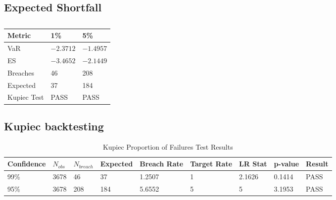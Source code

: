 \subsection{Expected Shortfall}


\begin{table}[H]
\centering
\caption{}
\begin{tabular}{|l|l|l|}
\hline
\textbf{Metric} & \textbf{1\%} & \textbf{5\%} \\
\hline
VaR              & $-2.3712$ & $-1.4957$ \\
\hline
ES               & $-3.4652$ & $-2.1449$ \\
\hline
Breaches         & 46        & 208       \\
\hline
Expected         & 37        & 184       \\
\hline
Kupiec Test      & PASS      & PASS        \\
\hline
\end{tabular}
\end{table}


\subsection{ Kupiec backtesting}


\begin{table}[H]
\centering
\caption{Kupiec Proportion of Failures Test Results}
\label{tab:kupiec_results}

\renewcommand{\arraystretch}{1.2}

\begin{tabular}{|l|l|l|l|l|l|l|l|l|}
\hline
\textbf{Confidence} &
\textbf{$N_{obs}$} &
\textbf{$N_{breach}$} &
\textbf{Expected} &
\textbf{Breach Rate} &
\textbf{Target Rate} &
\textbf{LR Stat} &
\textbf{p-value} &
\textbf{Result} \\
\hline

99\% & 3678 & 46  & 37  & 1.2507 & 1 & 2.1626 & 0.1414 & PASS \\
\hline

95\% & 3678 & 208 & 184 & 5.6552 & 5 & 5 & 3.1953 & PASS \\
\hline

\end{tabular}

\end{table}

